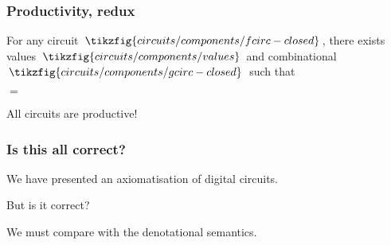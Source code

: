 \begin{frame}
    \frametitle{Productivity, redux}

    \begin{theorem}
        For any circuit $\,\tikzfig{circuits/components/fcirc-closed}\,$, there exists values $\,\tikzfig{circuits/components/values}\,$ and combinational $\,\tikzfig{circuits/components/gcirc-closed}\,$ such that 

        \pause

        \begin{center}
            \quad$=$\quad
        \end{center}
    \end{theorem}

    \pause
    \alert{All} circuits are productive!

\end{frame}


\begin{frame}
    \frametitle{Is this all correct?}

    We have presented an axiomatisation of digital circuits.

    \pause

    But is it correct?

    \pause

    We must compare with the \alert{denotational semantics}.
    
\end{frame}